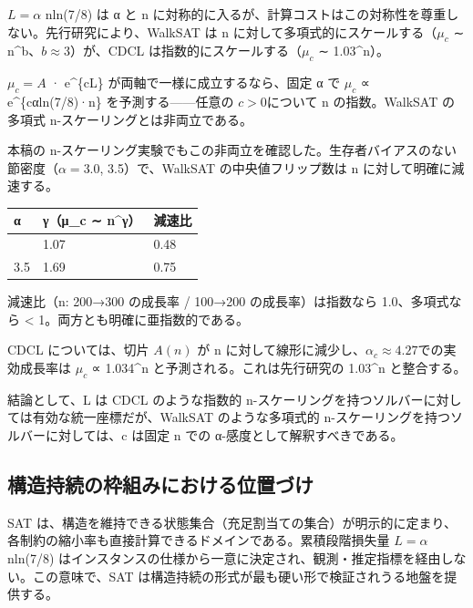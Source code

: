 \documentclass[12pt,a4paper]{article}
\begin{document}
\(L = \alpha\) n\textbar ln(7/8)\textbar{} は α と n に対称的に入るが、計算コストはこの対称性を尊重しない。先行研究により、WalkSAT は n に対して多項式的にスケールする（\(\mu_{c}\) ∼ n\^{}b、\(b ≈ 3\)）が、CDCL は指数的にスケールする（\(\mu_{c}\) ∼ 1.03\^{}n）。

\(\mu_{c} = A\) · e\^{}\{cL\} が両軸で一様に成立するなら、固定 α で \(\mu_{c}\) ∝ e\^{}\{cα\textbar ln(7/8)\textbar·n\} を予測する------任意の \(c > 0\)について n の指数。WalkSAT の多項式 n-スケーリングとは非両立である。

本稿の n-スケーリング実験でもこの非両立を確認した。生存者バイアスのない節密度（\(\alpha = 3.0\), 3.5）で、WalkSAT の中央値フリップ数は n に対して明確に減速する。

{\def\LTcaptype{table} %
\begin{longtable}[]{@{}lll@{}}
\toprule\noalign{}
α & γ（μ\_c ∼ n\^{}γ） & 減速比 \\
\midrule\noalign{}
\endhead
\bottomrule\noalign{}
\endlastfoot
3.0 & 1.07 & 0.48 \\
3.5 & 1.69 & 0.75 \\
\end{longtable}
}

減速比（n: 200→300 の成長率 / 100→200 の成長率）は指数なら 1.0、多項式なら \textless{} 1。両方とも明確に亜指数的である。

CDCL については、切片 \(A(n)\) が n に対して線形に減少し、\(\alpha_{c} ≈ 4.27\)での実効成長率は \(\mu_{c}\) ∝ 1.034\^{}n と予測される。これは先行研究の 1.03\^{}n と整合する。

結論として、L は CDCL のような指数的 n-スケーリングを持つソルバーに対しては有効な統一座標だが、WalkSAT のような多項式的 n-スケーリングを持つソルバーに対しては、c は固定 n での α-感度として解釈すべきである。

\subsection{構造持続の枠組みにおける位置づけ}\label{ux69cbux9020ux6301ux7d9aux306eux67a0ux7d44ux307fux306bux304aux3051ux308bux4f4dux7f6eux3065ux3051}

SAT は、構造を維持できる状態集合（充足割当ての集合）が明示的に定まり、各制約の縮小率も直接計算できるドメインである。累積段階損失量 \(L = \alpha\) n\textbar ln(7/8)\textbar{} はインスタンスの仕様から一意に決定され、観測・推定指標を経由しない。この意味で、SAT は構造持続の形式が最も硬い形で検証されうる地盤を提供する。
\end{document}

